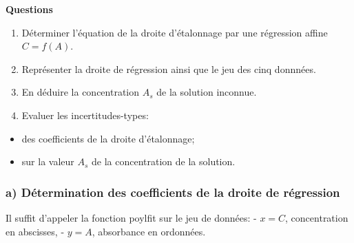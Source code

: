 \documentclass[11pt]{article}
\providecommand{\tightlist}{%
      \setlength{\itemsep}{0pt}\setlength{\parskip}{0pt}}
\begin{document}
    \textbf{Questions}

\begin{enumerate}
\def\labelenumi{\alph{enumi})}
\item
  Déterminer l'équation de la droite d'étalonnage par une régression
  affine \(C=f(A)\).
\item
  Représenter la droite de régression ainsi que le jeu des cinq
  donnnées.
\item
  En déduire la concentration \(A_s\) de la solution inconnue.
\item
  Evaluer les incertitudes-types:
\end{enumerate}

\begin{itemize}
\tightlist
\item
  des coefficients de la droite d'étalonnage;
\item
  sur la valeur \(A_s\) de la concentration de la solution.
\end{itemize}

    \hypertarget{a-duxe9termination-des-coefficients-de-la-droite-de-ruxe9gression}{%
\subsubsection{a) Détermination des coefficients de la droite de
régression}\label{a-duxe9termination-des-coefficients-de-la-droite-de-ruxe9gression}}

Il suffit d'appeler la fonction poylfit sur le jeu de données: -
\(x=C\), concentration en abscisses, - \(y=A\), absorbance en ordonnées.
\end{document}

